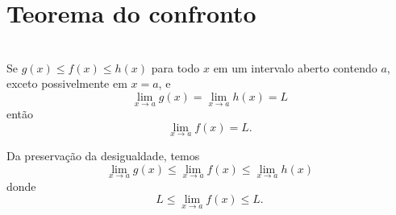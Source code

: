 \cleardoublepage\documentclass[../main.tex]{subfiles}
\begin{document}

\section{Teorema do confronto}\hypertarget{TeoConfronto}{}
\begin{framed}\begin{teo}~\label{teo:confronto}
\\  Se $g(x) \leq f(x) \leq h(x)$ para todo $x$ em um intervalo aberto contendo $a$, exceto possivelmente em $x=a$, e
  \begin{equation*}
 \lim_{x\to a} g(x)=\lim_{x\to a} h(x)=L
  \end{equation*}
  então
  \begin{equation*}
    \lim_{x\to a} f(x) = L.
  \end{equation*}
\end{teo}
\begin{framed}
\begin{dem}
  Da preservação da desigualdade, temos
  \begin{equation*}
    \lim_{x\to a} g(x) \leq \lim_{x\to a} f(x) \leq \lim_{x\to a} h(x)
  \end{equation*}
  donde
  \begin{equation*}
    L \leq \lim_{x\to a} f(x) \leq L.
  \end{equation*}
\end{dem}
\end{framed}\end{framed}
\end{document}
